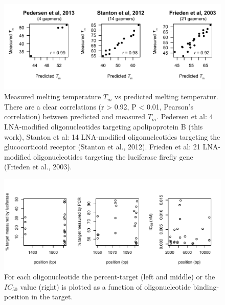 \documentclass[a4paper,11pt]{article}
\begin{document}
\begin{figure}[!h]
\begin{center}
\includegraphics[width=\textwidth]{SuppFigS3.pdf}
\end{center}
\caption{Measured melting temperature $T_m$ vs predicted melting temperatur. There are a clear correlations (r > 0.92, P < 0.01, Pearson's correlation) between predicted and measured $T_m$. Pedersen et al: 4 LNA-modified oligonucleotides targeting apolipoprotein B (this work), Stanton et al: 14 LNA-modified oligonucleotides targeting the glucocorticoid receptor (Stanton et al., 2012). Frieden et al: 21 LNA-modified oligonucleotides targeting the luciferase firefly gene (Frieden et al., 2003).}\label{fig:figTm}
\end{figure}

\begin{figure}[!h]
\begin{center}
\includegraphics[width=\textwidth]{SuppFile1-S4.pdf}
\end{center}
\caption{For each oligonucleotide the percent-target (left and middle) or the $IC_{50}$ value (right) is plotted as a function of oligonucleotide binding-position in the target.}\label{fig:position}
\end{figure}
\end{document}
